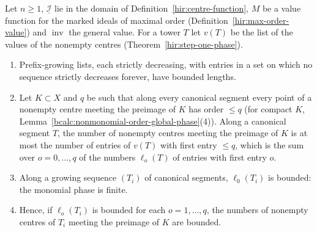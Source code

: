 \begin{lemma}
\label{bcalc:general-phase-count}
\mixedleanok
Let \(n\ge1\), \(\underline{\mathcal I}\) lie in the domain of Definition~\ref{hir:centre-function}, \(M\) be a value function for the marked ideals of maximal order
(Definition~\ref{hir:max-order-value}) and \(\operatorname{inv}\) the general value. For a tower \(T\) let \(v(T)\) be the list of the values of the nonempty centres
(Theorem~\ref{hir:step-one-phase}).
\begin{enumerate}
\item Prefix-growing lists, each strictly decreasing, with entries in a set on which no sequence strictly decreases forever, have bounded lengths.
\item Let \(K\subset X\) and \(q\) be such that along every canonical segment every point of a nonempty centre meeting the preimage of \(K\) has order \(\le q\)
(for compact \(K\), Lemma~\ref{bcalc:nonmonomial-order-global-phase}(4)). Along a canonical segment \(T\), the number of nonempty centres meeting the preimage of \(K\)
is at most the number of entries of \(v(T)\) with first entry \(\le q\), which is the sum over \(o=0,\dots,q\) of the numbers \(\ell_o(T)\) of entries with first entry \(o\).
\item Along a growing sequence \((T_i)\) of canonical segments, \(\ell_0(T_i)\) is bounded: the monomial phase is finite.
\item Hence, if \(\ell_o(T_i)\) is bounded for each \(o=1,\dots,q\), the numbers of nonempty centres of \(T_i\) meeting the preimage of \(K\) are bounded.
\end{enumerate}
\end{lemma}
